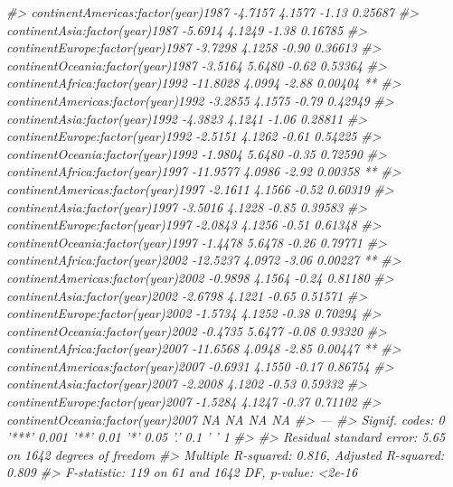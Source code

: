 \documentclass[]{book}
\newenvironment{Shaded}{\begin{snugshade}}{\end{snugshade}}
\newcommand{\CommentTok}[1]{\textcolor[rgb]{0.56,0.35,0.01}{\textit{#1}}}
\begin{document}
\begin{Shaded}
\begin{Highlighting}[]
\CommentTok{#> continentAmericas:factor(year)1987  -4.7157     4.1577   -1.13  0.25687    }
\CommentTok{#> continentAsia:factor(year)1987      -5.6914     4.1249   -1.38  0.16785    }
\CommentTok{#> continentEurope:factor(year)1987    -3.7298     4.1258   -0.90  0.36613    }
\CommentTok{#> continentOceania:factor(year)1987   -3.5164     5.6480   -0.62  0.53364    }
\CommentTok{#> continentAfrica:factor(year)1992   -11.8028     4.0994   -2.88  0.00404 ** }
\CommentTok{#> continentAmericas:factor(year)1992  -3.2855     4.1575   -0.79  0.42949    }
\CommentTok{#> continentAsia:factor(year)1992      -4.3823     4.1241   -1.06  0.28811    }
\CommentTok{#> continentEurope:factor(year)1992    -2.5151     4.1262   -0.61  0.54225    }
\CommentTok{#> continentOceania:factor(year)1992   -1.9804     5.6480   -0.35  0.72590    }
\CommentTok{#> continentAfrica:factor(year)1997   -11.9577     4.0986   -2.92  0.00358 ** }
\CommentTok{#> continentAmericas:factor(year)1997  -2.1611     4.1566   -0.52  0.60319    }
\CommentTok{#> continentAsia:factor(year)1997      -3.5016     4.1228   -0.85  0.39583    }
\CommentTok{#> continentEurope:factor(year)1997    -2.0843     4.1256   -0.51  0.61348    }
\CommentTok{#> continentOceania:factor(year)1997   -1.4478     5.6478   -0.26  0.79771    }
\CommentTok{#> continentAfrica:factor(year)2002   -12.5237     4.0972   -3.06  0.00227 ** }
\CommentTok{#> continentAmericas:factor(year)2002  -0.9898     4.1564   -0.24  0.81180    }
\CommentTok{#> continentAsia:factor(year)2002      -2.6798     4.1221   -0.65  0.51571    }
\CommentTok{#> continentEurope:factor(year)2002    -1.5734     4.1252   -0.38  0.70294    }
\CommentTok{#> continentOceania:factor(year)2002   -0.4735     5.6477   -0.08  0.93320    }
\CommentTok{#> continentAfrica:factor(year)2007   -11.6568     4.0948   -2.85  0.00447 ** }
\CommentTok{#> continentAmericas:factor(year)2007  -0.6931     4.1550   -0.17  0.86754    }
\CommentTok{#> continentAsia:factor(year)2007      -2.2008     4.1202   -0.53  0.59332    }
\CommentTok{#> continentEurope:factor(year)2007    -1.5284     4.1247   -0.37  0.71102    }
\CommentTok{#> continentOceania:factor(year)2007        NA         NA      NA       NA    }
\CommentTok{#> ---}
\CommentTok{#> Signif. codes:  0 '***' 0.001 '**' 0.01 '*' 0.05 '.' 0.1 ' ' 1}
\CommentTok{#> }
\CommentTok{#> Residual standard error: 5.65 on 1642 degrees of freedom}
\CommentTok{#> Multiple R-squared:  0.816,  Adjusted R-squared:  0.809 }
\CommentTok{#> F-statistic:  119 on 61 and 1642 DF,  p-value: <2e-16}
\end{Highlighting}
\end{Shaded}
\end{document}
